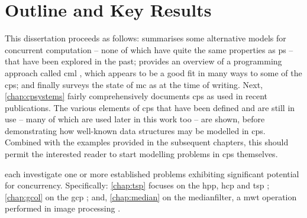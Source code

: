 
\section{Outline and Key Results}

This dissertation proceeds as follows:  summarises some alternative models for concurrent computation -- none of which have quite the same properties as \gls{ps} -- that have been explored in the past; provides an overview of a programming approach called \gls{cml} \cite{Reppy2007,Reppy1991}, which appears to be a good fit in many ways to some of the \gls{cps}; and finally surveys the state of \gls{mc} as at the time of writing.  Next, \cref{chap:cpsystems} fairly comprehensively documents \gls{cps} as used in recent publications.  The various elements of \gls{cps} that have been defined and are still in use -- many of which are used later in this work too -- are shown, before demonstrating how well-known data structures may be modelled in \gls{cps}.  Combined with the examples provided in the subsequent chapters, this should permit the interested reader to start modelling problems in \gls{cps} themselves.

 each investigate one or more established problems exhibiting significant potential for concurrency.  Specifically: \cref{chap:tsp} focuses on the \gls{hpp}, \gls{hcp} and \gls{tsp} \cite{Applegate2006,Cook2012}; \cref{chap:gcol} on the \gls{gcp} \cite{Lewis2016}; and, \cref{chap:median} on the \gls{medianfilter}, a \gls{mwt} operation performed in image processing \cite{Fisher2016,Gimelfarb2018}.

